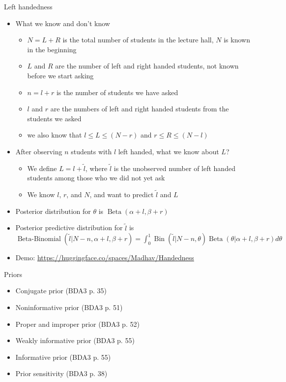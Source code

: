 \documentclass[english,t]{beamer}
\DeclareMathOperator{\Bin}{Bin}
\DeclareMathOperator{\Beta}{Beta}
\DeclareMathOperator{\BetaBinomial}{Beta-Binomial}
\begin{document}
\begin{frame}{Left handedness}

  \vspace{-0.5\baselineskip}
  \begin{itemize}
  \item What we know and don't know
    \begin{itemize}
    \item $N=L+R$ is the total number of students in the lecture hall,
      $N$ is known in the beginning
    \item $L$ and $R$ are the number of left and right handed students, not known before we start asking
    \item $n=l+r$ is the number of students we have asked
    \item $l$ and $r$ are the numbers of left and right handed students from the students we asked
    \item we also know that $l \leq L \leq (N-r)$ and $r \leq R \leq (N-l)$
    \end{itemize}
  \item After observing $n$ students with $l$ left handed, what we
    know about $L$?
    \begin{itemize}
    \item We define $L=l+\tilde{l}$, where $\tilde{l}$ is the
      unobserved number of left handed students among those who we did
      not yet ask
    \item We know $l$, $r$, and $N$, and want to predict $\tilde{l}$ and $L$
    \end{itemize}
  \item {\color{blue} Posterior} distribution for
    $\theta$ is $\Beta(\alpha+l, \beta+r)$
  \item {\color{red} Posterior predictive} distribution for
    $\displaystyle\tilde{l}$ is\\
    $\BetaBinomial(\tilde{l} | N-n, \alpha+l, \beta+r)=\int_0^1\Bin(\tilde{l} | N-n, \theta)\Beta(\theta | \alpha+l, \beta+r)d\theta$
  \item {\small Demo: \url{https://huggingface.co/spaces/Madhav/Handedness}}
  \end{itemize}
  
\end{frame}

\begin{frame}{Priors}

  \begin{itemize}
  \item Conjugate prior (BDA3 p. 35)
  \item Noninformative prior (BDA3 p. 51)
  \item Proper and improper prior (BDA3 p. 52)
  \item Weakly informative prior (BDA3 p. 55)
  \item Informative prior (BDA3 p. 55)
  \item Prior sensitivity (BDA3 p. 38)
  \end{itemize}

\end{frame}
\end{document}
